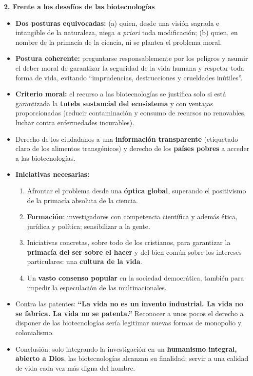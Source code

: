 \documentclass[10pt,a4paper]{article}
\begin{document}
\medskip\noindent \textbf{2. Frente a los desafíos de las biotecnologías}\par\nopagebreak
\begin{itemize}
\item \textbf{Dos posturas equivocadas:} (a) quien, desde una visión sagrada e intangible de la naturaleza, niega \textit{a priori} toda modificación; (b) quien, en nombre de la primacía de la ciencia, ni se plantea el problema moral.
\item \textbf{Postura coherente:} preguntarse responsablemente por los peligros y asumir el deber moral de garantizar la seguridad de la vida humana y respetar toda forma de vida, evitando ``imprudencias, destrucciones y crueldades inútiles''.
\item \textbf{Criterio moral:} el recurso a las biotecnologías se justifica solo si está garantizada la \textbf{tutela sustancial del ecosistema} y con ventajas proporcionadas (reducir contaminación y consumo de recursos no renovables, luchar contra enfermedades incurables).
\item Derecho de los ciudadanos a una \textbf{información transparente} (etiquetado claro de los alimentos transgénicos) y derecho de los \textbf{países pobres} a acceder a las biotecnologías.
\item \textbf{Iniciativas necesarias:}
\begin{enumerate}
\item Afrontar el problema desde una \textbf{óptica global}, superando el positivismo de la primacía absoluta de la ciencia.
\item \textbf{Formación}: investigadores con competencia científica y además ética, jurídica y política; sensibilizar a la gente.
\item Iniciativas concretas, sobre todo de los cristianos, para garantizar la \textbf{primacía del ser sobre el hacer} y del bien común sobre los intereses particulares: una \textbf{cultura de la vida}.
\item Un \textbf{vasto consenso popular} en la sociedad democrática, también para impedir la especulación de las multinacionales.
\end{enumerate}
\item Contra las patentes: \textbf{``La vida no es un invento industrial. La vida no se fabrica. La vida no se patenta.''} Reconocer a unos pocos el derecho a disponer de las biotecnologías sería legitimar nuevas formas de monopolio y colonialismo.
\item Conclusión: solo integrando la investigación en un \textbf{humanismo integral, abierto a Dios}, las biotecnologías alcanzan su finalidad: servir a una calidad de vida cada vez más digna del hombre.
\end{itemize}
\end{document}
